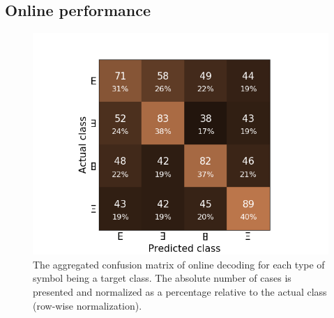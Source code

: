 \documentclass[12pt]{iopart}
\begin{document}
\subsection{Online performance}

\begin{figure}[!t]
\center
    \includegraphics[trim={1cm 0cm 1cm 1cm},clip,width=0.7\columnwidth]{../images/OnlineConfusion_percent_eight.png}
    \caption{The aggregated confusion matrix of online decoding for each type of symbol being
    a target class. The absolute number of cases is presented and normalized as a percentage 
    relative to the actual class (row-wise normalization).}
\label{fig:onlineconf}
\end{figure}
\end{document}
